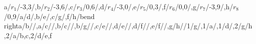 \begin{compatibilitygraph}{a/$r_1$/{-3,3}/,b/$r_2$/{-3,6}/,c/$r_3$/{0,6}/,d/$r_4$/{-3,0}/,e/$r_5$/{0,3}/,f/$r_6$/{0,0}/,g/$r_7$/{-3,9}/,h/$r_8$/{0,9}/}{a/d/,b/e/,c/g/,f/h/bend right}{a/b//,a/c//,b/c//,b/g//,c/e//,d/e//,d/f//,e/f//,g/h//}{}{}{1/g/,1/a/,1/d/,2/g/{h},2/a/{b,c},2/d/{e,f}}
\end{compatibilitygraph}